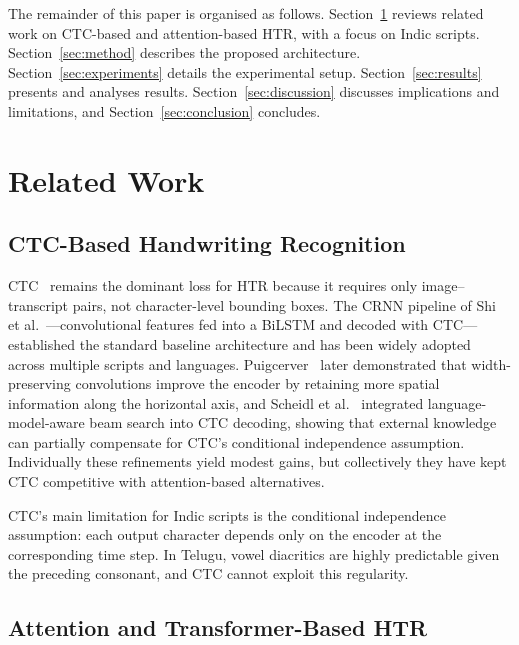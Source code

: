 \documentclass[pdflatex,sn-mathphys-num]{sn-jnl}
\begin{document}
The remainder of this paper is organised as follows. Section~\ref{sec:related} reviews related work on CTC-based and attention-based HTR, with a focus on Indic scripts. Section~\ref{sec:method} describes the proposed architecture. Section~\ref{sec:experiments} details the experimental setup. Section~\ref{sec:results} presents and analyses results. Section~\ref{sec:discussion} discusses implications and limitations, and Section~\ref{sec:conclusion} concludes.

\section{Related Work}\label{sec:related}

\subsection{CTC-Based Handwriting Recognition}\label{sec:related:ctc}

CTC~\cite{graves2006ctc} remains the dominant loss for HTR because it requires only image--transcript pairs, not character-level bounding boxes. The CRNN pipeline of Shi et al.~\cite{shi2017crnn}---convolutional features fed into a BiLSTM and decoded with CTC---established the standard baseline architecture and has been widely adopted across multiple scripts and languages. Puigcerver~\cite{puigcerver2017} later demonstrated that width-preserving convolutions improve the encoder by retaining more spatial information along the horizontal axis, and Scheidl et al.~\cite{scheidl2018word} integrated language-model-aware beam search into CTC decoding, showing that external knowledge can partially compensate for CTC's conditional independence assumption. Individually these refinements yield modest gains, but collectively they have kept CTC competitive with attention-based alternatives.

CTC's main limitation for Indic scripts is the conditional independence assumption: each output character depends only on the encoder at the corresponding time step. In Telugu, vowel diacritics are highly predictable given the preceding consonant, and CTC cannot exploit this regularity.

\subsection{Attention and Transformer-Based HTR}\label{sec:related:attn}
\end{document}
